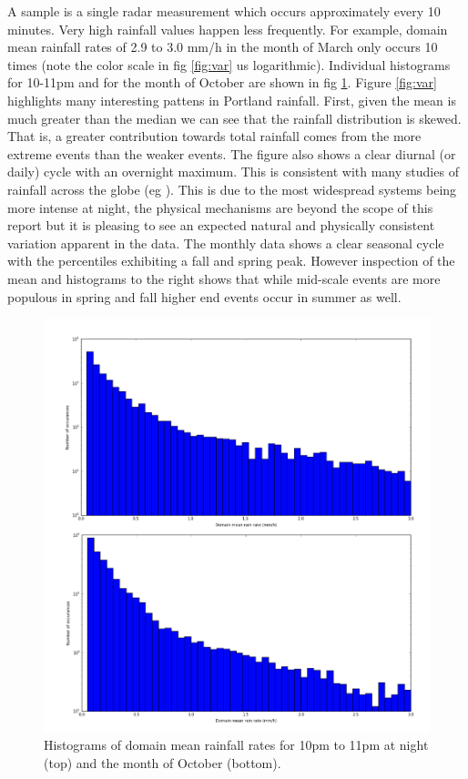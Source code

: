 \documentclass[twocol]{ametsoc}
\begin{document}
A sample is a single radar measurement which occurs approximately every 10 minutes. Very high rainfall values happen 
less frequently. For example, domain mean rainfall rates of 2.9 to 3.0 mm/h in the month of March only occurs 10 times
(note the color scale in fig \ref{fig:var} us logarithmic). Individual histograms for 10-11pm and for the month of October are shown in 
fig \ref{fig:hists}.
Figure \ref{fig:var} highlights many interesting pattens in Portland rainfall. First, given the mean is much greater than the 
median we can see that the rainfall distribution is skewed. That is, a greater contribution towards total rainfall comes 
from the more extreme events than the weaker events. 
The figure also shows a clear diurnal (or daily) cycle with an overnight maximum. This is consistent with many studies 
of rainfall across the globe (eg \cite{nesbitt_diurnal_2003}). This is due to the most widespread systems being more 
intense at night, the physical mechanisms are beyond the scope of this report but it is pleasing to see an expected 
natural and physically consistent variation apparent in the data. 
The monthly data shows a clear seasonal cycle with the percentiles exhibiting a fall and spring peak. However inspection
 of the mean and histograms to the right shows that while mid-scale events are more populous in spring and fall higher end 
 events occur in summer as well. 
 
 \begin{figure}
    \centering
    \includegraphics[width=0.8\columnwidth]{hists.png}
    \caption{Histograms of domain mean rainfall rates for 10pm to 11pm at night (top) and the month of October (bottom). }
    \label{fig:hists}
\end{figure}
 
\end{document}

